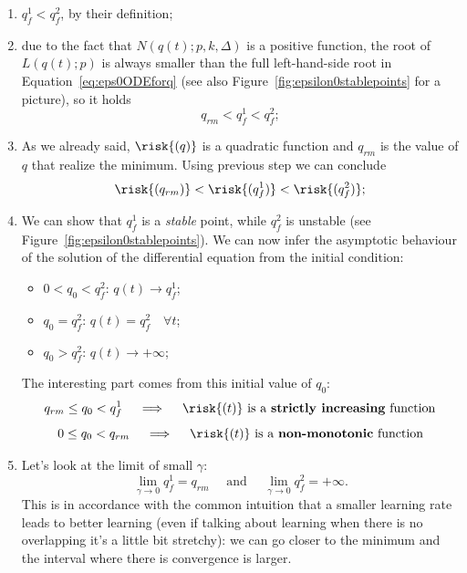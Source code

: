 \begin{enumerate}
  \item \(q_f^1 < q_f^2\), by their definition;
  \item due to the fact that \(N{(q{(t)};p,k,\Delta)}\) is a positive function,
        the root of \(L{(q{(t)};p)}\) is always smaller than the full left-hand-side
        root in Equation~\eqref{eq:eps0ODEforq} (see also Figure~\ref{fig:epsilon0stablepoints} for a picture),
        so it holds\[q_{rm}<q_f^1 < q_f^2;\]
  \item As we already said, \(\risk{(q)}\) is a quadratic function and \(q_{rm}\) is the value of \(q\) that realize the minimum. Using previous step we can conclude
  \[\risk{(q_{rm})}<\risk{(q_f^1)} < \risk{(q_f^2)};\]
  \item We can show that \(q_f^1\) is a \emph{stable} point, while \(q_f^2\) is unstable (see Figure~\ref{fig:epsilon0stablepoints}).
  We can now infer the asymptotic behaviour of the solution of the differential equation from the initial condition:
        \begin{itemize}
            \item \(0<q_0<q_f^2\): \(q{(t)}\to q_f^1\);
            \item \(q_0=q_f^2\): \(q{(t)}= q_f^2 \quad \forall t\);
            \item \(q_0>q_f^2\): \(q{(t)}\to +\infty\);
        \end{itemize}
        The interesting part comes from this initial value of \(q_0\):
        \[q_{rm}\le q_0<q_f^1 \quad \implies \quad \text{\(\risk{(t)}\) is a \textbf{strictly increasing} function}\]
        \[0\le q_0<q_{rm}     \quad \implies \quad \text{\(\risk{(t)}\) is a \textbf{non-monotonic} function}\]
  \item Let's look at the limit of small \(\gamma\):
        \[\lim_{\gamma\to0}q_f^1 = q_{rm} \quad\text{ and }\quad \lim_{\gamma\to0}q_f^2 = +\infty.\]
        This is in accordance with the common intuition that a smaller learning rate leads to better learning
        (even if talking about learning when there is no overlapping it's a little bit stretchy):
        we can go closer to the minimum and the interval where there is convergence is larger.
\end{enumerate}

